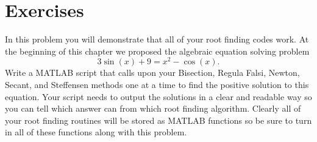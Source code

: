 \newpage\section{Exercises}



\begin{problem}
    In this problem you will demonstrate that all of your root finding codes work.
    At the beginning of this chapter we proposed the algebraic equation solving problem
    \[ 3\sin(x) + 9 = x^2 - \cos(x). \]
    Write a MATLAB script that calls upon your Bisection, Regula Falsi, Newton, Secant,
    and Steffensen methods one at a time to find the positive solution to this equation.
    Your script needs to output the solutions in a clear and readable way so you can
    tell which answer can from which root finding algorithm. Clearly all of your root
    finding routines will be stored as MATLAB functions so be sure to turn in all of these
    functions along with this problem.
\end{problem}


